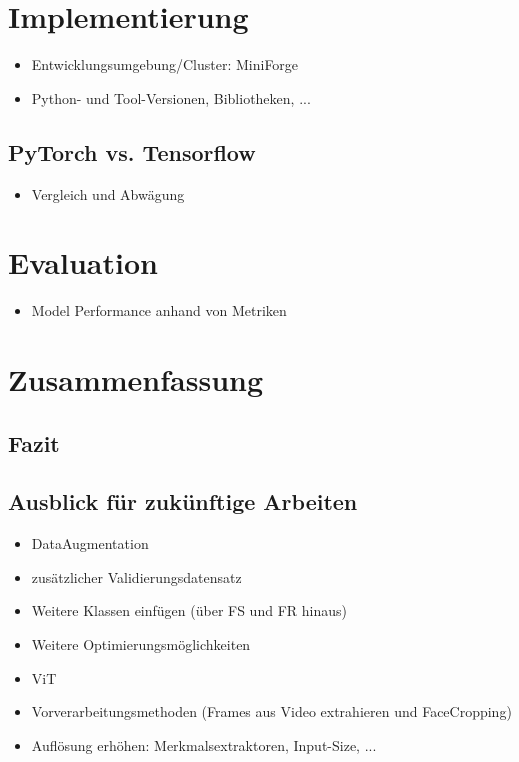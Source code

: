 \documentclass{article}
\begin{document}
    \section{Implementierung}
    \begin{itemize}
        \item Entwicklungsumgebung/Cluster: MiniForge
        \item Python- und Tool-Versionen, Bibliotheken, ... %
    \end{itemize}
    \subsection{PyTorch vs. Tensorflow}
    \begin{itemize}
        \item Vergleich und Abwägung
    \end{itemize}
    \section{Evaluation}
    \begin{itemize}
        \item Model Performance anhand von Metriken
    \end{itemize}

    \section{Zusammenfassung}
    \subsection{Fazit}
    \subsection{Ausblick für zukünftige Arbeiten}
    \begin{itemize}
        \item DataAugmentation
        \item zusätzlicher Validierungsdatensatz %
        \item Weitere Klassen einfügen (über FS und FR hinaus)
        \item Weitere Optimierungsmöglichkeiten
        \item ViT
        \item Vorverarbeitungsmethoden (Frames aus Video extrahieren und FaceCropping)
        \item Auflösung erhöhen: Merkmalsextraktoren, Input-Size, ...
    \end{itemize}

    
    
\end{document}
